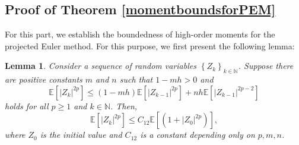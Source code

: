 \documentclass[12pt]{article}
\numberwithin{equation}{section}
\newtheorem{lemma}[assumption]{Lemma}
\begin{document}
\subsection{Proof of Theorem \ref{momentboundsforPEM}}
For this part, we establish the boundedness of high-order moments for the projected Euler method. For this purpose, we first present the following lemma:
\begin{lemma}\label{lemma5.2} 
Consider a sequence of random variables $\left\{Z_k\right\}_{k \in \mathbb{N}}$. Suppose there are positive constants $m$ and $n$ such that $1-mh>0$  and
\begin{equation}\tag{5.53}\label{5.5}
\mathbb{E}\left[\left|Z_k\right|^{2 p}\right] \leq\left(1-m h\right)\mathbb{E}\left[\left|Z_{k-1}\right|^{2 p}\right]+n h\mathbb{E}\left[\left|Z_{k-1}\right|^{2 p-2}\right]
\end{equation}
holds for all $p \geq 1$ and $k \in \mathbb{N}$. Then,
\begin{equation}\tag{5.54}\label{5.6}
\mathbb{E}\left[\left|Z_k\right|^{2 p}\right] \leq C_{12}\mathbb{E}\left[\left(1+\left|Z_0\right|^{2 p}\right)\right],
\end{equation}
where $Z_0$ is the initial value and $C_{12}$ is a constant depending only on $p, m, n$.
\end{lemma}
\end{document}
